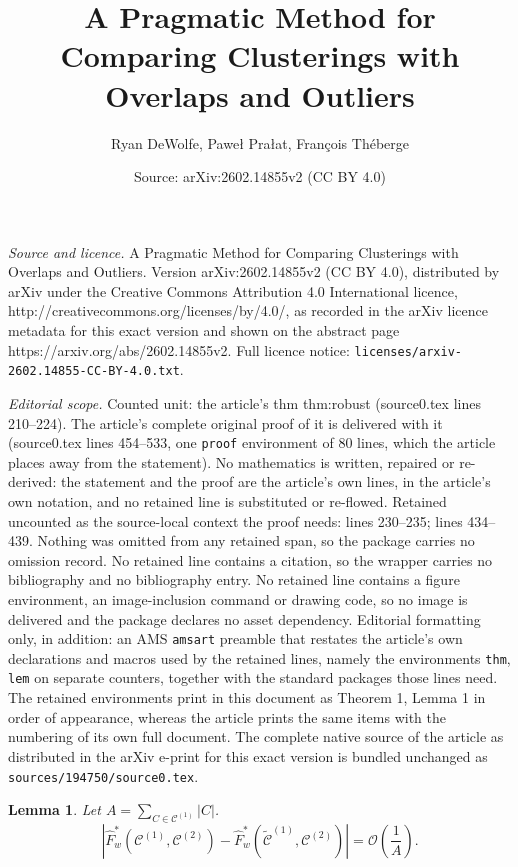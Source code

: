 \documentclass[10pt,a4paper]{amsart}
\title{A Pragmatic Method for Comparing Clusterings with Overlaps and Outliers}
\author{Ryan DeWolfe, Pawe{\l} Pra{\l}at, Fran\c{c}ois Th\'eberge}
\date{Source: arXiv:2602.14855v2 (CC BY 4.0)}
\newtheorem{lem}{Lemma}
\newcommand{\bigO}{\mathcal{O}}
\newcommand\cCone{\mathcal{C}^{(1)}}
\newcommand\cCtwo{\mathcal{C}^{(2)}}
\newcommand\tcCone{\tilde{\mathcal{C}}^{(1)}}
\begin{document}
\maketitle

\noindent\emph{Source and licence.} A Pragmatic Method for Comparing Clusterings with Overlaps and Outliers. Version arXiv:2602.14855v2 (CC BY 4.0), distributed by arXiv under the Creative Commons Attribution 4.0 International licence, http://creativecommons.org/licenses/by/4.0/, as recorded in the arXiv licence metadata for this exact version and shown on the abstract page https://arxiv.org/abs/2602.14855v2. Full licence notice: \texttt{licenses/arxiv-2602.14855-CC-BY-4.0.txt}.\par\smallskip

\noindent\textit{Editorial scope.} Counted unit: the article's thm thm:robust (source0.tex lines 210--224). The article's complete original proof of it is delivered with it (source0.tex lines 454--533, one \texttt{proof} environment of 80 lines, which the article places away from the statement). No mathematics is written, repaired or re-derived: the statement and the proof are the article's own lines, in the article's own notation, and no retained line is substituted or re-flowed.  Retained uncounted as the source-local context the proof needs: lines 230--235; lines 434--439.  Nothing was omitted from any retained span, so the package carries no omission record.  No retained line contains a citation, so the wrapper carries no bibliography and no bibliography entry.  No retained line contains a figure environment, an image-inclusion command or drawing code, so no image is delivered and the package declares no asset dependency.  Editorial formatting only, in addition: an AMS \texttt{amsart} preamble that restates the article's own declarations and macros used by the retained lines, namely the environments \texttt{thm}, \texttt{lem} on separate counters, together with the standard packages those lines need.  The retained environments print in this document as Theorem 1, Lemma 1 in order of appearance, whereas the article prints the same items with the numbering of its own full document.  The complete native source of the article as distributed in the arXiv e-print for this exact version is bundled unchanged as \texttt{sources/194750/source0.tex}.
\begin{lem}\label{lem:two}
    Let $A = \sum_{C \in \cCone} |C|$.
    \begin{equation*}
        \left| \hat{F}^*_w(\cCone, \cCtwo) - \hat{F}^*_w(\tcCone, \cCtwo) \right| = \bigO\left(\frac{1}{A}\right).
    \end{equation*}
\end{lem}
\end{document}
